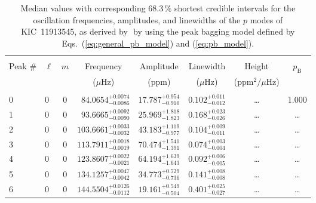 \begin{table*}[!]
\caption{Median values with corresponding 68.3\,\% shortest credible intervals for the oscillation frequencies, amplitudes, and linewidths of the $p$ modes of KIC~11913545, as derived by \diamonds\,\,by using the peak bagging model defined by Eqs.~(\ref{eq:general_pb_model}) and (\ref{eq:pb_model}).}
\label{tab:11913545p}
\centering
\begin{tabular}{llcrrlrc}
\hline\hline
\\[-8pt]
Peak \# & $\ell$ & $m$ & \multicolumn{1}{c}{Frequency} & \multicolumn{1}{c}{Amplitude} & \multicolumn{1}{c}{Linewidth} & \multicolumn{1}{c}{Height}& $p_\mathrm{B}$\\
 & & & \multicolumn{1}{c}{($\mu$Hz)} & \multicolumn{1}{c}{(ppm)} & \multicolumn{1}{c}{($\mu$Hz)} & \multicolumn{1}{c}{(ppm$^2/\mu$Hz)}\\
\hline \\[-8pt]
0 & 0 & 0 & $     84.0654_{-      0.0086}^{+      0.0074}$ & $      17.787_{-       0.910}^{+       0.954}$ & $       0.102_{-       0.012}^{+       0.011}$ & \multicolumn{1}{c}{\dots} & 1.000\\[1pt]
1 & 0 & 0 & $     93.6665_{-      0.0090}^{+      0.0092}$ & $      25.969_{-       1.823}^{+       1.818}$ & $       0.168_{-       0.026}^{+       0.023}$ & \multicolumn{1}{c}{\dots} & \dots \\[1pt]
2 & 0 & 0 & $    103.6661_{-      0.0032}^{+      0.0033}$ & $      43.183_{-       0.977}^{+       1.119}$ & $       0.104_{-       0.011}^{+       0.009}$ & \multicolumn{1}{c}{\dots} & \dots \\[1pt]
3 & 0 & 0 & $    113.7911_{-      0.0019}^{+      0.0018}$ & $      70.474_{-       1.391}^{+       1.541}$ & $       0.074_{-       0.004}^{+       0.003}$ & \multicolumn{1}{c}{\dots} & \dots \\[1pt]
4 & 0 & 0 & $    123.8607_{-      0.0021}^{+      0.0022}$ & $      64.194_{-       1.643}^{+       1.639}$ & $       0.092_{-       0.005}^{+       0.006}$ & \multicolumn{1}{c}{\dots} & \dots \\[1pt]
5 & 0 & 0 & $    134.1257_{-      0.0042}^{+      0.0047}$ & $      34.773_{-       0.736}^{+       0.729}$ & $       0.141_{-       0.008}^{+       0.008}$ & \multicolumn{1}{c}{\dots} & \dots \\[1pt]
6 & 0 & 0 & $    144.5504_{-      0.0112}^{+      0.0126}$ & $      19.161_{-       0.504}^{+       0.549}$ & $       0.401_{-       0.027}^{+       0.025}$ & \multicolumn{1}{c}{\dots} & \dots \\[1pt]

\end{tabular}
\end{table*}
